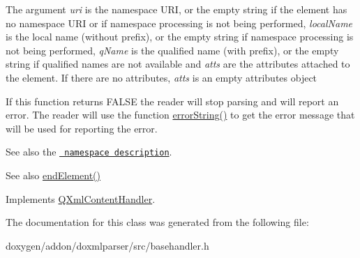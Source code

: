 The argument {\itshape uri} is the namespace U\+RI, or the empty string if the element has no namespace U\+RI or if namespace processing is not being performed, {\itshape local\+Name} is the local name (without prefix), or the empty string if namespace processing is not being performed, {\itshape q\+Name} is the qualified name (with prefix), or the empty string if qualified names are not available and {\itshape atts} are the attributes attached to the element. If there are no attributes, {\itshape atts} is an empty attributes object

If this function returns F\+A\+L\+SE the reader will stop parsing and will report an error. The reader will use the function \mbox{\hyperlink{class_q_xml_default_handler_afcbe5fdce86cea4b7863e752c2413c45}{error\+String()}} to get the error message that will be used for reporting the error.

See also the \href{xml-sax.html\#namespaces}{\texttt{ namespace description}}.

\begin{DoxySeeAlso}{See also}
\mbox{\hyperlink{class_base_handler_aa1b987506d2f962ba478b8bab388bff9}{end\+Element()}} 
\end{DoxySeeAlso}


Implements \mbox{\hyperlink{class_q_xml_content_handler_af6d4e631fad2b9b75622c95003b1da55}{Q\+Xml\+Content\+Handler}}.



The documentation for this class was generated from the following file\+:\begin{DoxyCompactItemize}
\item 
doxygen/addon/doxmlparser/src/basehandler.\+h\end{DoxyCompactItemize}
